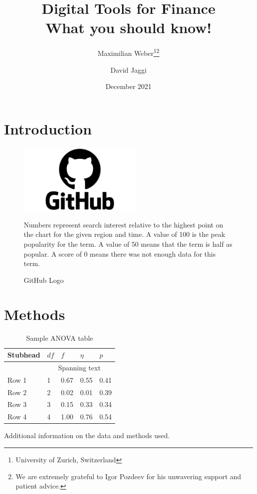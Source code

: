 \documentclass[10pt,a4paper]{article}
\title{%
  Digital Tools for Finance \\
  \large What you should know!}
\author{Maximilian Weber\thanks{University of Zurich, Switzerland}\;\thanks{We are extremely grateful to Igor Pozdeev for his unwavering support and patient advice.} \\
\and David Jaggi\footnotemark[1]\;\footnotemark[2]}
\date{December 2021}
\begin{document}
\maketitle

\begin{abstract}
    \blindtext
\end{abstract}

\tableofcontents
\section{Introduction}
\blindtext[3]
\textcite{gormsenCoronavirusImpactStock2020}
\begin{figure}[h!]%
    \centering
    \includegraphics[width=6cm]{text/paper/github_logo.png}%
    \caption{GitHub Logo}%
    \footnotesize Numbers represent search interest relative to the highest point on the chart for the given region and time. A value of 100 is the peak popularity for the term. A value of 50 means that the term is half as popular. A score of 0 means there was not enough data for this term.
    \label{fig:github_logo}%
\end{figure}
\section{Methods}
\blindtext[3]
\textcite{kozlowskiTailThatWags2020}
\begin{table}
    \centering  
  \begin{threeparttable}
    \caption{Sample ANOVA table}
     \begin{tabular}{lllll}
        \toprule
        Stubhead & \( df \) & \( f \) & \( \eta \) & \( p \) \\
        \midrule
                 &     \multicolumn{4}{c}{Spanning text}     \\
        Row 1    & 1        & 0.67    & 0.55       & 0.41    \\
        Row 2    & 2        & 0.02    & 0.01       & 0.39    \\
        Row 3    & 3        & 0.15    & 0.33       & 0.34    \\
        Row 4    & 4        & 1.00    & 0.76       & 0.54    \\
        \bottomrule
     \end{tabular}
    \begin{tablenotes}
      \small
      \item Additional information on the data and methods used.
    \end{tablenotes}
  \end{threeparttable}
\end{table}
\end{document}
